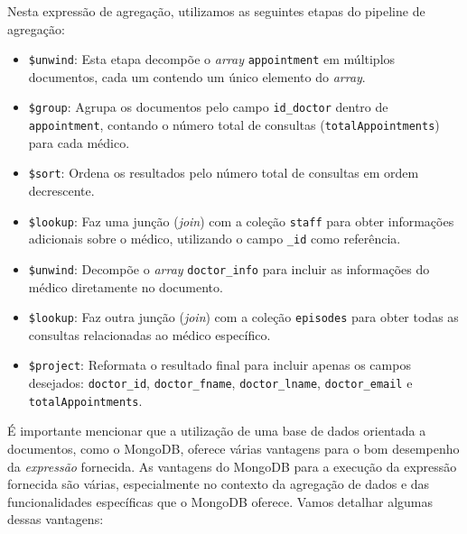 Nesta expressão de agregação, utilizamos as seguintes etapas do pipeline de agregação:

\begin{itemize}
    \item \texttt{\$unwind}: Esta etapa decompõe o \textit{array} \texttt{appointment} em múltiplos documentos, cada um contendo um único elemento do \textit{array}.
    \item \texttt{\$group}: Agrupa os documentos pelo campo \texttt{id\_doctor} dentro de \texttt{appointment}, contando o número total de consultas (\texttt{totalAppointments}) para cada médico.
    \item \texttt{\$sort}: Ordena os resultados pelo número total de consultas em ordem decrescente.
    \item \texttt{\$lookup}: Faz uma junção (\textit{join}) com a coleção \texttt{staff} para obter informações adicionais sobre o médico, utilizando o campo \texttt{\_id} como referência.
    \item \texttt{\$unwind}: Decompõe o \textit{array} \texttt{doctor\_info} para incluir as informações do médico diretamente no documento.
    \item \texttt{\$lookup}: Faz outra junção (\textit{join}) com a coleção \texttt{episodes} para obter todas as consultas relacionadas ao médico específico.
    \item \texttt{\$project}: Reformata o resultado final para incluir apenas os campos desejados: \texttt{doctor\_id}, \texttt{doctor\_fname}, \texttt{doctor\_lname}, \texttt{doctor\_email} e \texttt{totalAppointments}.
\end{itemize}

É importante mencionar que a utilização de uma base de dados orientada a documentos, como o MongoDB, oferece várias vantagens para o bom desempenho da \textit{expressão} fornecida. As vantagens do MongoDB para a execução da expressão fornecida são várias, especialmente no contexto da agregação de dados e das funcionalidades específicas que o MongoDB oferece. Vamos detalhar algumas dessas vantagens:

